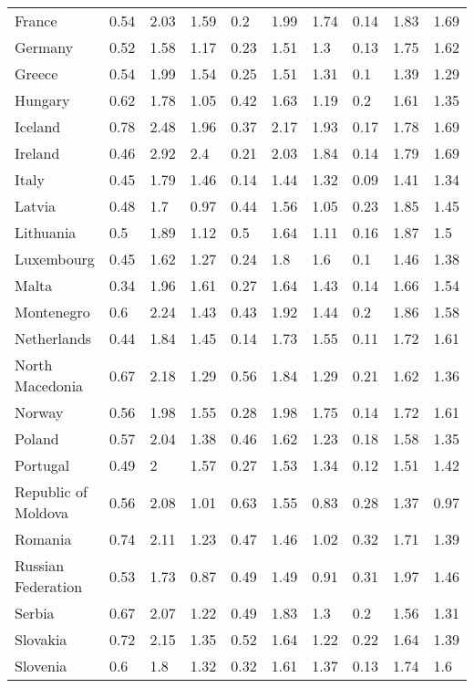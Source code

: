 \begin{longtable}[t]{llllllllll}
France & 0.54 & 2.03 & 1.59 & 0.2 & 1.99 & 1.74 & 0.14 & 1.83 & 1.69\\
Germany & 0.52 & 1.58 & 1.17 & 0.23 & 1.51 & 1.3 & 0.13 & 1.75 & 1.62\\
Greece & 0.54 & 1.99 & 1.54 & 0.25 & 1.51 & 1.31 & 0.1 & 1.39 & 1.29\\
\addlinespace
Hungary & 0.62 & 1.78 & 1.05 & 0.42 & 1.63 & 1.19 & 0.2 & 1.61 & 1.35\\
Iceland & 0.78 & 2.48 & 1.96 & 0.37 & 2.17 & 1.93 & 0.17 & 1.78 & 1.69\\
Ireland & 0.46 & 2.92 & 2.4 & 0.21 & 2.03 & 1.84 & 0.14 & 1.79 & 1.69\\
Italy & 0.45 & 1.79 & 1.46 & 0.14 & 1.44 & 1.32 & 0.09 & 1.41 & 1.34\\
Latvia & 0.48 & 1.7 & 0.97 & 0.44 & 1.56 & 1.05 & 0.23 & 1.85 & 1.45\\
\addlinespace
Lithuania & 0.5 & 1.89 & 1.12 & 0.5 & 1.64 & 1.11 & 0.16 & 1.87 & 1.5\\
Luxembourg & 0.45 & 1.62 & 1.27 & 0.24 & 1.8 & 1.6 & 0.1 & 1.46 & 1.38\\
Malta & 0.34 & 1.96 & 1.61 & 0.27 & 1.64 & 1.43 & 0.14 & 1.66 & 1.54\\
Montenegro & 0.6 & 2.24 & 1.43 & 0.43 & 1.92 & 1.44 & 0.2 & 1.86 & 1.58\\
Netherlands & 0.44 & 1.84 & 1.45 & 0.14 & 1.73 & 1.55 & 0.11 & 1.72 & 1.61\\
\addlinespace
North Macedonia & 0.67 & 2.18 & 1.29 & 0.56 & 1.84 & 1.29 & 0.21 & 1.62 & 1.36\\
Norway & 0.56 & 1.98 & 1.55 & 0.28 & 1.98 & 1.75 & 0.14 & 1.72 & 1.61\\
Poland & 0.57 & 2.04 & 1.38 & 0.46 & 1.62 & 1.23 & 0.18 & 1.58 & 1.35\\
Portugal & 0.49 & 2 & 1.57 & 0.27 & 1.53 & 1.34 & 0.12 & 1.51 & 1.42\\
Republic of Moldova & 0.56 & 2.08 & 1.01 & 0.63 & 1.55 & 0.83 & 0.28 & 1.37 & 0.97\\
\addlinespace
Romania & 0.74 & 2.11 & 1.23 & 0.47 & 1.46 & 1.02 & 0.32 & 1.71 & 1.39\\
Russian Federation & 0.53 & 1.73 & 0.87 & 0.49 & 1.49 & 0.91 & 0.31 & 1.97 & 1.46\\
Serbia & 0.67 & 2.07 & 1.22 & 0.49 & 1.83 & 1.3 & 0.2 & 1.56 & 1.31\\
Slovakia & 0.72 & 2.15 & 1.35 & 0.52 & 1.64 & 1.22 & 0.22 & 1.64 & 1.39\\
Slovenia & 0.6 & 1.8 & 1.32 & 0.32 & 1.61 & 1.37 & 0.13 & 1.74 & 1.6\\

\end{longtable}
